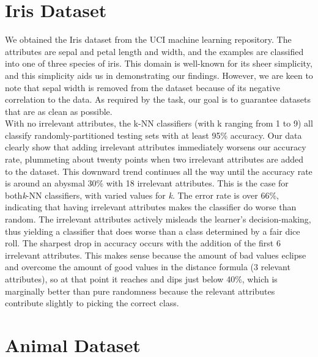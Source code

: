 \documentclass{article}
\begin{document}
\section{Iris Dataset}

We obtained the Iris dataset from the UCI machine learning repository. The attributes are sepal and petal length and width, and the examples are classified into one of three species of iris. This domain is well-known for its sheer simplicity, and this simplicity aids us in demonstrating our findings. However, we are keen to note that sepal width is removed from the dataset because of its negative correlation to the data. As required by the task, our goal is to guarantee datasets that are as clean as possible. \\ 

With no irrelevant attributes, the k-NN classifiers (with k ranging from 1 to 9) all classify randomly-partitioned testing sets with at least 95\% accuracy. Our data clearly show that adding irrelevant attributes immediately worsens our accuracy rate, plummeting about twenty points when two irrelevant attributes are added to the dataset. This downward trend continues all the way until the accuracy rate is around an abysmal 30\% with 18 irrelevant attributes. This is the case for both\textit{k}-NN classifiers, with varied values for \textit{k}. The error rate is over 66\%, indicating that having irrelevant attributes makes the classifier do worse than random. The irrelevant attributes actively misleads the learner's decision-making, thus yielding a classifier that does worse than a class determined by a fair dice roll. The sharpest drop in accuracy occurs with the addition of the first 6 irrelevant attributes. This makes sense because the amount of bad values eclipse and overcome the amount of good values in the distance formula (3 relevant attributes), so at that point it reaches and dips just below 40\%, which is marginally better than pure randomness because the relevant attributes contribute slightly to picking the correct class. \\

\section{Animal Dataset}
\end{document}

